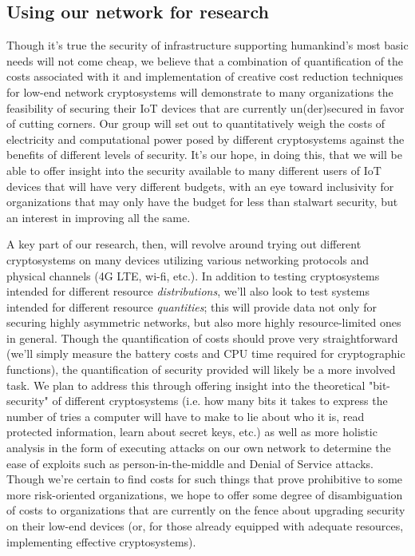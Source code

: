 \documentclass[a4paper,titlepage]{article}
\begin{document}
\subsection{Using our network for research}
Though it's true the security of infrastructure supporting humankind's most basic needs will not come cheap, we believe that a combination of quantification of the costs associated with it and implementation of creative cost reduction techniques for low-end network cryptosystems will demonstrate to many organizations the feasibility of securing their IoT devices that are currently un(der)secured in favor of cutting corners. Our group will set out to quantitatively weigh the costs of electricity and computational power posed by different cryptosystems against the benefits of different levels of security. It's our hope, in doing this, that we will be able to offer insight into the security available to many different users of IoT devices that will have very different budgets, with an eye toward inclusivity for organizations that may only have the budget for less than stalwart security, but an interest in improving all the same. 

A key part of our research, then, will revolve around trying out different cryptosystems on many devices utilizing various networking protocols and physical channels (4G LTE, wi-fi, etc.). In addition to testing cryptosystems intended for different resource \textit{distributions}, we'll also look to test systems intended for different resource \textit{quantities}; this will provide data not only for securing highly asymmetric networks, but also more highly resource-limited ones in general. Though the quantification of costs should prove very straightforward (we'll simply measure the battery costs and CPU time required for cryptographic functions), the quantification of security provided will likely be a more involved task. We plan to address this through offering insight into the theoretical "bit-security" of different cryptosystems (i.e. how many bits it takes to express the number of tries a computer will have to make to lie about who it is, read protected information, learn about secret keys, etc.) as well as more holistic analysis in the form of executing attacks on our own network to determine the ease of exploits such as person-in-the-middle and Denial of Service attacks. Though we're certain to find costs for such things that prove prohibitive to some more risk-oriented organizations, we hope to offer some degree of disambiguation of costs to organizations that are currently on the fence about upgrading security on their low-end devices (or, for those already equipped with adequate resources, implementing effective cryptosystems).
    
\end{document}
